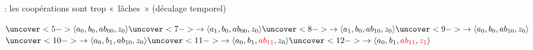 \begin{frame}[t]
\medskip

 : les coopérations sont trop «~lâches~» (décalage temporel)

\medskip

$ \uncover<5->{\PHstate{a_0, b_0, ab_{00}, z_0}}
  \uncover<7->{\rightarrow\PHstate{a_1, b_0, ab_{00}, z_0}}
  \uncover<8->{\rightarrow\PHstate{a_1, b_0, ab_{10}, z_0}}
  \uncover<9->{\rightarrow\PHstate{a_0, b_0, ab_{10}, z_0}}$
\\ \qquad
$ \uncover<10->{\rightarrow\PHstate{a_0, b_1, ab_{10}, z_0}}
  \uncover<11->{\rightarrow\PHstate{a_0, b_1, \redex{ab_{11}}, z_0}}
  \uncover<12->{\rightarrow\PHstate{a_0, b_1, \redex{ab_{11}}, \redex{z_1}}}$

\medskip

\end{frame}
